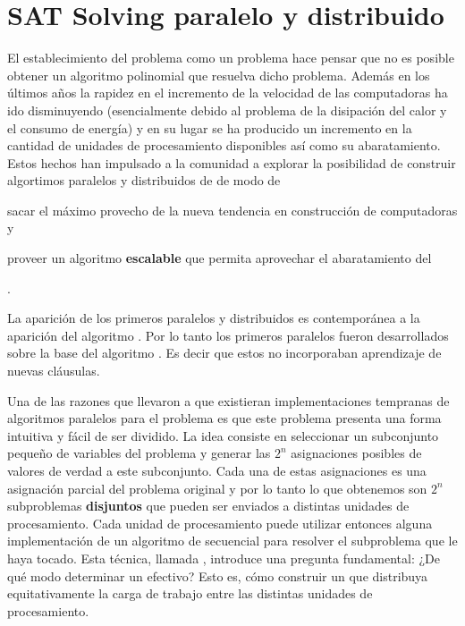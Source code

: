 \section{SAT Solving paralelo y distribuido}

El establecimiento del problema \sat como un problema \npc hace pensar que no
es posible obtener un algoritmo polinomial que resuelva dicho problema. Además
en los últimos años la rapidez en el incremento de la velocidad de las
computadoras ha ido disminuyendo (esencialmente debido al problema de la
disipación del calor y el consumo de energía) y en su lugar se ha producido un
incremento en la cantidad de unidades de procesamiento disponibles así como su
abaratamiento. Estos hechos han impulsado a la comunidad \sat a explorar la
posibilidad de construir algortimos paralelos y distribuidos de \ssolving de
modo de \begin{inparaenum}[a)] \item sacar el máximo provecho de la nueva
tendencia en construcción de computadoras y \item proveer un algoritmo
\textbf{escalable} que permita aprovechar el abaratamiento del \hard
\end{inparaenum}.

La aparición de los primeros \ssolvers paralelos y distribuidos
\cite{bohm:1996:afast, zhang:jsc-1996} es contemporánea a la aparición del
algoritmo \CDCL. Por lo tanto los primeros \ssolvers paralelos fueron
desarrollados sobre la base del algoritmo \dpll. Es decir que estos \ssolvers
no incorporaban aprendizaje de nuevas cláusulas.

Una de las razones que llevaron a que existieran implementaciones tempranas de
algoritmos paralelos para el problema \sat es que este problema presenta una
forma intuitiva y fácil de ser dividido. La idea consiste en seleccionar un
subconjunto pequeño de variables del problema y generar las $2^n$ asignaciones
posibles de valores de verdad a este subconjunto. Cada una de estas
asignaciones es una asignación parcial del problema original y por lo tanto lo
que obtenemos son $2^n$ subproblemas \textbf{disjuntos} que pueden ser
enviados a distintas unidades de procesamiento. Cada unidad de procesamiento
puede utilizar entonces alguna implementación de un algoritmo de \ssolving
secuencial para resolver el subproblema que le haya tocado. Esta técnica,
llamada \gp, introduce una pregunta fundamental: ¿De qué modo determinar un
\gp efectivo? Esto es, cómo construir un \gp que distribuya equitativamente la
carga de trabajo entre las distintas unidades de procesamiento.

